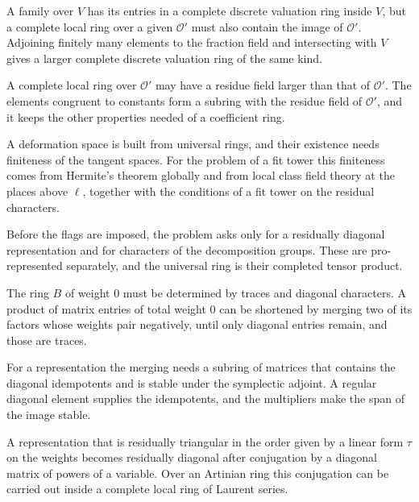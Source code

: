 A family over $V$ has its entries in a complete discrete valuation ring inside $V$, but a complete local ring over a given $\mathcal O'$ must also contain the image of $\mathcal O'$. Adjoining finitely many elements to the fraction field and intersecting with $V$ gives a larger complete discrete valuation ring of the same kind.

A complete local ring over $\mathcal O'$ may have a residue field larger than that of $\mathcal O'$. The elements congruent to constants form a subring with the residue field of $\mathcal O'$, and it keeps the other properties needed of a coefficient ring.

A deformation space is built from universal rings, and their existence needs finiteness of the tangent spaces. For the problem of a fit tower this finiteness comes from Hermite's theorem globally and from local class field theory at the places above $\ell$, together with the conditions of a fit tower on the residual characters.

Before the flags are imposed, the problem asks only for a residually diagonal representation and for characters of the decomposition groups. These are pro-represented separately, and the universal ring is their completed tensor product.

The ring $B$ of weight $0$ must be determined by traces and diagonal characters. A product of matrix entries of total weight $0$ can be shortened by merging two of its factors whose weights pair negatively, until only diagonal entries remain, and those are traces.

For a representation the merging needs a subring of matrices that contains the diagonal idempotents and is stable under the symplectic adjoint. A regular diagonal element supplies the idempotents, and the multipliers make the span of the image stable.

A representation that is residually triangular in the order given by a linear form $\tau$ on the weights becomes residually diagonal after conjugation by a diagonal matrix of powers of a variable. Over an Artinian ring this conjugation can be carried out inside a complete local ring of Laurent series.


